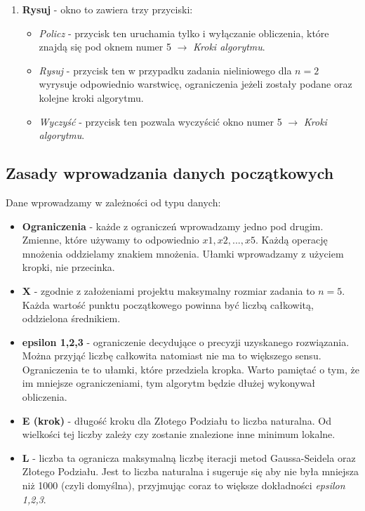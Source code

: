 \documentclass[a4paper,12pt]{article}
\begin{document}
\begin{enumerate}
\begin{itemize}
        \end{itemize}
    \item \textbf{Rysuj} - okno to zawiera trzy przyciski:
        \begin{itemize}
            \item \textit{Policz} - przycisk ten uruchamia tylko i wyłączanie obliczenia, które znajdą się pod oknem numer 5 $\rightarrow$ \textit{Kroki algorytmu}.
            \item \textit{Rysuj} - przycisk ten w przypadku zadania nieliniowego dla $n = 2$ wyrysuje odpowiednio warstwicę, ograniczenia jeżeli zostały podane oraz kolejne kroki algorytmu.
            \item \textit{Wyczyść} - przycisk ten pozwala wyczyścić okno numer 5 $\rightarrow$ \textit{Kroki algorytmu}.
        \end{itemize}
\end{enumerate}

\subsection{Zasady wprowadzania danych początkowych}
Dane wprowadzamy w zależności od typu danych:
\begin{itemize}
    \item \textbf{Ograniczenia} - każde z ograniczeń wprowadzamy jedno pod drugim. Zmienne, które używamy to odpowiednio $x1, x2, ..., x5$. Każdą operację mnożenia oddzielamy znakiem mnożenia. Ułamki wprowadzamy z użyciem kropki, nie przecinka.
    \item \textbf{X} - zgodnie z założeniami projektu maksymalny rozmiar zadania to $n = 5$. Każda wartość punktu początkowego powinna być liczbą całkowitą, oddzielona średnikiem.
    \item \textbf{epsilon 1,2,3} - ograniczenie decydujące o precyzji uzyskanego rozwiązania. Można przyjąć liczbę całkowita natomiast nie ma to większego sensu. Ograniczenia te to ułamki, które przedziela kropka. Warto pamiętać o tym, że im mniejsze ograniczeniami, tym algorytm będzie dłużej wykonywał obliczenia.
    \item \textbf{E (krok)} - długość kroku dla Złotego Podziału to liczba naturalna. Od wielkości tej liczby zależy czy zostanie znalezione inne minimum lokalne.
    \item \textbf{L} - liczba ta ogranicza maksymalną liczbę iteracji metod Gaussa-Seidela oraz Złotego Podziału. Jest to liczba naturalna i sugeruje się aby nie była mniejsza niż 1000 (czyli domyślna), przyjmując coraz to większe dokładności \textit{epsilon 1,2,3}.
\end{itemize}
\end{document}
